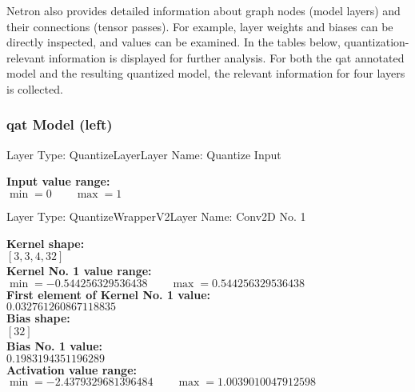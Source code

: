 {Netron also provides detailed information about graph nodes (model layers) and their connections (tensor passes). For example, layer weights and biases can be directly inspected, and values can be examined.
In the tables below, quantization-relevant information is displayed for further analysis. For both the \gls{qat} annotated model and the resulting quantized model, the relevant information for four layers is collected.

\subsubsection*{\gls{qat} Model (left)}

\begin{layerbox}{Layer Type: QuantizeLayer}{Layer Name: Quantize Input}
  \begin{center}
    \textbf{Input value range:} \\[2pt]
    $\min = 0 \quad\quad \max = 1$
  \end{center}
\end{layerbox}

\begin{layerbox}{Layer Type: QuantizeWrapperV2}{Layer Name: Conv2D No. 1}
  \begin{center}
    \textbf{Kernel shape:} \\[2pt]
    $[3, 3, 4, 32]$ \\[6pt]
    \textbf{Kernel No. 1 value range:} \\[2pt]
    $\min = -0.544256329536438 \quad\quad \max = 0.544256329536438$ \\[6pt]
    \textbf{First element of Kernel No. 1 value:} \\[2pt]
    $0.032761260867118835$ \\[6pt]
    \textbf{Bias shape:} \\[2pt]
    $[32]$ \\[6pt]
    \textbf{Bias No. 1 value:} \\[2pt]
    $0.1983194351196289$ \\[6pt]
    \textbf{Activation value range:} \\[2pt]
    $\min = -2.4379329681396484 \quad\quad \max = 1.0039010047912598$
  \end{center}
\end{layerbox}

}
